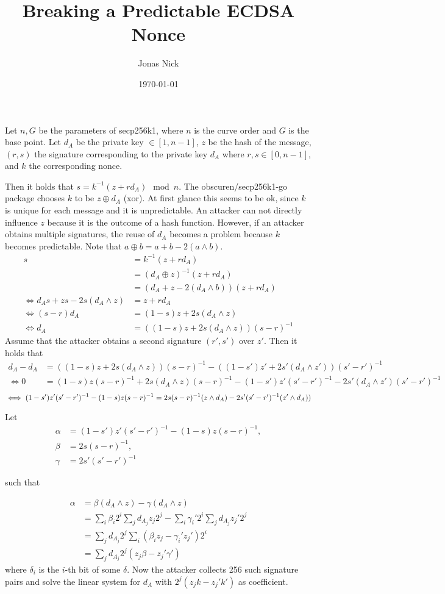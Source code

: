 \documentclass[11pt,a4paper,oneside]{article}
\title{Breaking a Predictable ECDSA Nonce}
\date{\today}
\author{Jonas Nick}
\begin{document}
\maketitle 
Let $n, G$ be the parameters of secp256k1, where $n$ is the curve order and $G$ is the base point.
Let $d_A$ be the private key $\in [1, n-1]$, $z$ be the hash of the message, $(r,s)$ the signature corresponding
to the private key $d_A$ where $r,s \in [0, n-1]$, and $k$ the corresponding nonce.

Then it holds that $s=k^{-1}(z+rd_A)\mod n$. The obscuren/secp256k1-go package chooses $k$ to be
$z\oplus d_A$ (xor). 
At first glance this seems to be ok, since $k$ is unique for each message and
it is unpredictable. An attacker can not directly influence $z$ because it is the outcome of a hash function.
However, if an attacker obtains multiple signatures, the reuse of $d_A$ becomes a problem because $k$ 
becomes predictable. Note that $a \oplus b = a + b - 2(a\wedge b)$.
\begin{align*}
s&=k^{-1}(z+rd_A) \\
    &= (d_A\oplus z)^{-1}(z+rd_A)\\
    &= (d_A + z - 2(d_A\wedge b))(z+rd_A)\\
    \iff d_As + zs - 2s(d_A\wedge z)&= z + rd_A\\
    \iff (s-r)d_A &= (1-s)z + 2s(d_A\wedge z)\\
    \iff d_A &= ((1-s)z + 2s(d_A\wedge z))(s-r)^{-1}
\end{align*}
Assume that the attacker obtains a second signature $(r', s')$ over $z'$.
Then it holds that
\begin{align*}
    d_A - d_A &= ((1-s)z + 2s(d_A\wedge z))(s-r)^{-1} - ((1-s')z' + 2s'(d_A\wedge z'))(s'-r')^{-1} \\
\iff  0  &= (1-s)z(s-r)^{-1} + 2s(d_A\wedge z)(s-r)^{-1} - (1-s')z'(s'-r')^{-1} - 2s'(d_A\wedge z')(s'-r')^{-1} 
\end{align*}
$$
    \iff(1-s')z'(s'-r')^{-1} - (1-s)z(s-r)^{-1}=  2s(s-r)^{-1}(z \wedge d_A) - 2s'(s'-r')^{-1}(z' \wedge d_A) ) \\
$$


Let 
\begin{align*}
    \alpha &= (1-s')z'(s'-r')^{-1} - (1-s)z(s-r)^{-1}, \\
    \beta &= 2s(s-r)^{-1}, \\
    \gamma &= 2s'(s'-r')^{-1} 
\end{align*}

such that

\begin{align*}
    \alpha &= \beta (d_A \wedge z) - \gamma(d_A \wedge z) \\
           &= \sum_{i} \beta_i 2^i\sum_{j} d_{A_j} z_j 2^{j} - \sum_{i} \gamma_i' 2^i\sum_{j} d_{A_j} z_j' 2^{j} \\
    &= \sum_{j} d_{A_j} 2^j \sum_i (\beta_i z_j - \gamma_i' z_j') 2^i \\
    &= \sum_{j} d_{A_j} 2^j (z_j \beta - z_j' \gamma')
\end{align*}
where $\delta_i$ is the $i$-th bit of some $\delta$.
Now the attacker collects 256 such signature pairs and solve the linear system for $d_A$ with $2^j (z_j k - z_j' k')$ as coefficient.
\end{document}
